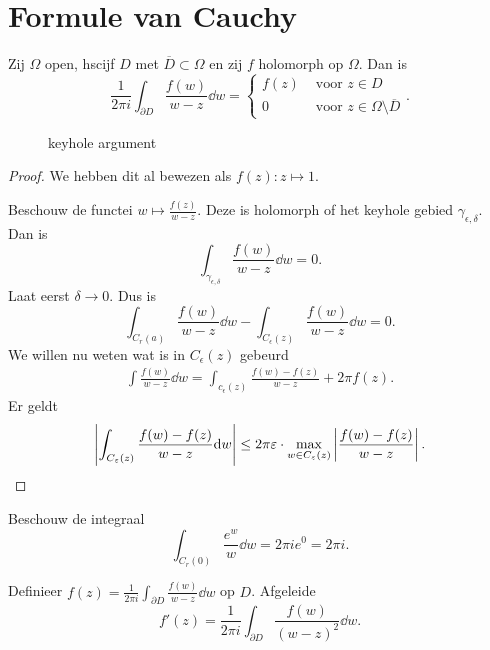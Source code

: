 \setcounter{section}{3}
\section{Formule van Cauchy} \label{sec:formule_van_cauchy}
\begin{stelling}
	Zij $\Omega$ open, hscijf $D$ met $\overline{D} \subset \Omega$ en zij $f$ holomorph op $\Omega$. Dan is \[
		\frac{1}{2\pi i } \int_{\partial D} \frac{f(w)}{w - z} \dd w = \begin{cases}
			f(z) & \text{ voor $z \in D$}\\
			0 & \text{ voor $z \in \Omega \setminus \overline{D}$}

		\end{cases} 	
	.\] 
\end{stelling}
\begin{figure}[ht]
    \centering
    \caption{keyhole argument}
    \label{fig:keyhole-argument}
\end{figure}
\begin{proof}
	We hebben dit al bewezen als $f(z):z\mapsto  1$.

	Beschouw de functei $w\mapsto \frac{f(z)}{w - z}$. Deze is holomorph of het keyhole gebied $\gamma_{\epsilon, \delta}$. 
Dan is \[
	\int_{\gamma_{\epsilon, \delta}} \frac{f(w)}{w - z} \dd w = 0
.\] 
Laat eerst $\delta \to 0$. Dus is
 \[
	 \int_{C_r(a)} \frac{f(w)}{w - z }\dd w - \int_{C_\epsilon (z)}\frac{f(w)}{w - z} \dd w = 0
 .\] 
 We willen nu weten wat is in $C_\epsilon(z)$ gebeurd
 \begin{align*}
	 \int \frac{f(w)}{w - z} \dd w = \int_{c_\epsilon (z) } \frac{f(w) - f(z)}{w - z} + 2\pi f(z)
 .\end{align*}
 Er geldt \[
	 \left| \int_{C_\varepsilon (z)} \frac{f(w) - f(z)}{w - z} \mathrm{d} w  \right| \le 2 \pi \varepsilon \cdot \max_{w \in C_\varepsilon (z)} \left| \frac{f(w) - f(z)}{w - z} \right|
 .\] 
\end{proof}

\begin{vb}
	Beschouw de integraal \[
		\int_{C_r(0)} \frac{e^{w}}{w} \dd w = 2 \pi i e^{0} = 2 \pi i
	.\] 
\end{vb}
\begin{vb}
	Definieer  $f(z) = \frac{1}{2\pi i} \int_{\partial D} \frac{f(w)}{w - z} \dd w$ op $D$. Afgeleide  \[
		f'(z) = \frac{1}{2\pi i } \int _{\partial D} \frac{f(w)}{(w - z)^2} \dd w
	.\] 
\end{vb}
